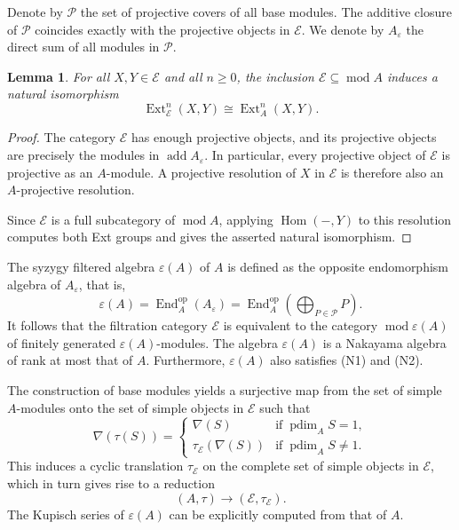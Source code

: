 \documentclass[a4paper,reqno]{amsart}
\numberwithin{equation}{section}
\theoremstyle{plain}
\newtheorem{lem}[thm]{Lemma}
\theoremstyle{definition}
\theoremstyle{remark}
\DeclareMathOperator{\Hom}{Hom}
\DeclareMathOperator{\Ext}{Ext}
\DeclareMathOperator{\End}{End}
\renewcommand{\mod}{\operatorname{mod}}
\DeclareMathOperator{\pdim}{pdim}
\DeclareMathOperator{\op}{op}
\DeclareMathOperator{\add}{add}
\renewcommand{\-}{\mbox{-}}
\newcommand{\scE}{\mathcal{E}}
\newcommand{\scP}{\mathcal{P}}
\begin{document}
Denote by \(\scP\) the set of projective covers of all base modules.
The additive closure  of \(\scP\) coincides 
exactly with the projective objects in \(\scE \).
We denote by \(A_\varepsilon\) the direct sum of all modules in \(\scP\).

\begin{lem}\label{lem:ext-comparison}
For all $X,Y\in\scE$ and all $n\geq 0$, the inclusion
$\scE\subseteq\mod A$ induces a natural isomorphism
\[
  \Ext^n_{\scE}(X,Y)\cong \Ext^n_A(X,Y).
\]
\end{lem}

\begin{proof}
The category $\scE$ has enough projective objects, 
and its projective objects are precisely
the modules in $\add A_\varepsilon$. In particular, every projective object of
$\scE$ is projective as an $A$-module. A projective resolution of $X$ in $\scE$
is therefore also an $A$-projective resolution. 

Since $\scE$ is a full subcategory
of $\mod A$, applying $\Hom(-,Y)$ to this resolution computes both Ext groups and
gives the asserted natural isomorphism.
\end{proof}
The {syzygy filtered algebra} \(\varepsilon(A)\) of \(A\) is defined as 
the opposite endomorphism algebra of \(A_\varepsilon\), that is, 
\begin{equation*}
    \varepsilon(A)=\End_A^{\op}(A_\varepsilon)=\End_A^{\op}(\bigoplus\nolimits_{P\in\scP} P).
\end{equation*}
It follows that the filtration category \(\scE \) is equivalent to the category 
\(\mod\varepsilon(A)\) of finitely generated \(\varepsilon(A)\)-modules.
The algebra \(\varepsilon(A)\) is a Nakayama algebra of rank  at most that of \(A\).
Furthermore, \(\varepsilon(A)\) also satisfies (N1) and (N2).


The construction of base modules yields a surjective map from the set 
of simple \(A\)-modules onto the set of simple objects in \(\scE\) such that 
\begin{equation*}
    \nabla(\tau(S))=
    \begin{cases}
    \nabla(S)& \textrm{if}\; \pdim_AS=1, \\
    \tau_\scE (\nabla(S))  & \textrm{if}\; \pdim_AS\neq 1.
    \end{cases}
\end{equation*}
This induces a cyclic translation \(\tau_\scE \) 
on the complete set of simple objects in \(\scE\),
which in turn gives rise to a reduction
\[(A,\tau)\to (\scE,\tau_\scE).\]
The Kupisch series of \(\varepsilon(A)\) 
can be explicitly computed from that of \(A\).
\end{document}
